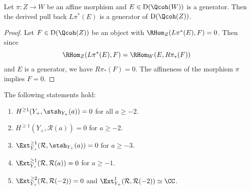 \begin{Lemma} \label{lem plus 1}
Let $\pi\colon Z \to W$ be an affine morphism and $E \in \mathrm{D}(\Qcoh(W))$ is a generator.
Then the derived pull back $L\pi^*(E)$ is a generator of $\mathrm{D}(\Qcoh(Z))$.
\end{Lemma}

\begin{proof}
Let $F \in \mathrm{D}(\Qcoh(Z))$ be an object with $\RHom_Z(L\pi^*(E), F) = 0$.
Then since
\[
\RHom_Z(L\pi^*(E), F) = \RHom_W(E, R\pi_*(F))
\] and $E$ is a generator,
we have $R\pi_*(F) = 0$.
The affineness of the morphism $\pi$ implies $F = 0$.
\end{proof}

\begin{Proposition} \label{prop plus 1}
The following statements hold:
\begin{enumerate}\itemsep=0pt
\item[$1.$] $H^{\geq 1}(Y_+, \stsh_{Y_+}(a)) = 0$ for all $a \geq -2$.
\item[$2$.] $H^{\geq 1}(Y_+, \mathcal{R}(a)) = 0$ for $a \geq -2$.
\item[$3.$] $\Ext_{Y_+}^{\geq 1}(\mathcal{R}, \stsh_{Y_+}(a)) = 0$ for $a \geq -3$.
\item[$4.$] $\Ext_{Y_+}^{\geq 1}(\mathcal{R}, \mathcal{R}(a)) = 0$ for $a \geq -1$.
\item[$5.$] $\Ext_{Y_+}^{\geq 2}(\mathcal{R}, \mathcal{R}(-2)) = 0$ and $\Ext_{Y_+}^{1}(\mathcal{R}, \mathcal{R}(-2)) \simeq \CC$.
\end{enumerate}
\end{Proposition}

